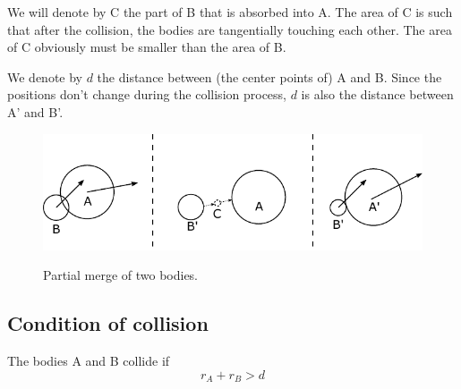 \documentclass{article}
\begin{document}
We will denote by C the part of B that is absorbed into A. The area of C is such that after the collision, the bodies are tangentially touching each other. The area of C obviously must be smaller than the area of B.

We denote by $d$ the distance between (the center points of) A and B. Since the positions don't change during the collision process, $d$ is also the distance between A' and B'.

\begin{figure}[h]
	\centering
	{\includegraphics{figures/partial_merge.pdf}}
	\caption{Partial merge of two bodies.}\label{fig:partial_merge}
\end{figure}

\subsection{Condition of collision}
The bodies A and B collide if
\begin{equation}
\label{eq:collision_condition_partial_merge}
r_A + r_B > d
\end{equation}
\end{document}
